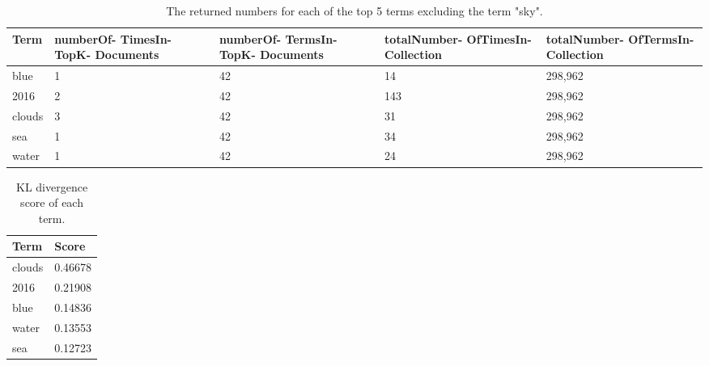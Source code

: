 \begin{table}
	\centering
    \begin{tabular}{|l|p{30mm}|p{30mm}|p{30mm}|p{30mm}|}
		\hline
    \textbf{Term}   & \textbf{numberOf- \newline TimesIn- \newline TopK- \newline Documents} &
		\textbf{numberOf- \newline TermsIn- \newline TopK- \newline Documents} &
		\textbf{totalNumber- \newline OfTimesIn- \newline Collection} &
		\textbf{totalNumber- \newline OfTermsIn- \newline Collection} \\ \hline
    blue   & 1                            & 42                           & 14                             & 298,962                         \\ \hline
    2016   & 2                            & 42                           & 143                            & 298,962                         \\ \hline
    clouds & 3                            & 42                           & 31                             & 298,962                         \\ \hline
    sea    & 1                            & 42                           & 34                             & 298,962                         \\ \hline
    water  & 1                            & 42                           & 24                             & 298,962                         \\ \hline
\end{tabular}
	\caption{The returned numbers for each of the top 5 terms excluding the term "sky".}
	\label{tbl:kl-counts}
\end{table}

\begin{table}
	\centering
    \begin{tabular}{|l|l|}
		\hline
    \textbf{Term}   & \textbf{Score}   \\ \hline
    clouds & 0.46678 \\ \hline
    2016   & 0.21908 \\ \hline
    blue   & 0.14836 \\ \hline
    water  & 0.13553 \\ \hline
    sea    & 0.12723 \\ \hline
    \end{tabular}
	\caption{KL divergence score of each term.}
	\label{tbl:kl-score}
\end{table}
